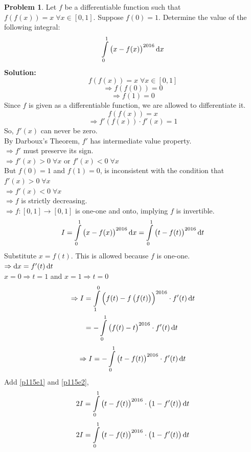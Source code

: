 \documentclass[14]{article}
\theoremstyle{definition}
\newtheorem{prob}{Problem}
\theoremstyle{case}
\begin{document}
\begin{prob}
Let $f$ be a differentiable function such that $f\left( f(x) \right) = x \; \forall x \in [0, 1]$. Suppose $f(0) = 1$. Determine the value of the following integral:
\[\int\limits_0^1 \left( x - f(x) \right)^{2016} \dif x\]
\textbf{Solution:}\\
\[f\left(f(x)\right) = x \; \forall x \in [0, 1]\]
\[\Rightarrow f\left(f(0)\right) = 0\]
\[\Rightarrow f(1) = 0\]
Since $f$ is given as a differentiable function, we are allowed to differentiate it.
\[f\left(f(x)\right) = x\]
\[\Rightarrow f'\left(f(x)\right) \cdot f'(x) = 1\]
So, $f'(x)$ can never be zero.\\
By Darboux's Theorem, $f'$ has intermediate value property.\\
$\Rightarrow f'$ must preserve its sign.\\
$\Rightarrow f'(x) > 0 \; \forall x$ or $f'(x) < 0 \; \forall x$\\
But $f(0) = 1$ and $f(1) = 0$, is inconsistent with the condition that $f'(x) > 0 \; \forall x$\\
$\Rightarrow f'(x) < 0 \; \forall x$\\
$\Rightarrow f$ is strictly decreasing.\\
$\Rightarrow f : [0, 1] \to [0, 1]$ is one-one and onto, implying $f$ is invertible. 
\begin{equation} \label{p115e1}
I = \int\limits_0^1 \left( x - f(x) \right)^{2016} \dif x = \int\limits_0^1 \left( t - f(t) \right)^{2016} \dif t
\end{equation}
Substitute $x = f(t)$. This is allowed because $f$ is one-one.\\
$\Rightarrow \dif x = f'(t) \dif t$\\
$x = 0 \Rightarrow t = 1$ and $x = 1 \Rightarrow t = 0$
\begin{align*}
\Rightarrow I &= \int\limits_1^0 \left( f(t) - f\left( f(t) \right) \right)^{2016} \cdot f'(t) \dif t\\
&= -\int\limits_0^1 \left( f(t) - t \right)^{2016} \cdot f'(t) \dif t\\
\end{align*}
\begin{equation}\label{p115e2}
\Rightarrow I = -\int\limits_0^1 \left( t - f(t) \right)^{2016} \cdot f'(t) \dif t
\end{equation}
Add \eqref{p115e1} and \eqref{p115e2},
\[2I = \int\limits_0^1 \left( t - f(t)\right)^{2016} \cdot \left(1 - f'(t)\right) \dif t\]
\pagebreak
\[2I = \int\limits_0^1 \left( t - f(t)\right)^{2016} \cdot \left(1 - f'(t)\right) \dif t\]

\end{prob}
\end{document}
